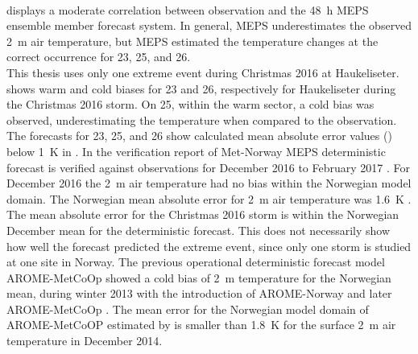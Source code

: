 \\
 displays a moderate correlation between observation and the \SI{48}{\hour} MEPS ensemble member forecast system. In general, MEPS underestimates the observed \SI{2}{\metre} air temperature, but MEPS estimated the temperature changes at the correct occurrence for \num{23}, \num{25}, and \SI{26}{\dec}. 
\\
This thesis uses only one extreme event during Christmas 2016 at Haukeliseter. 
 shows warm and cold biases for \num{23} and \SI{26}{\dec}, respectively for Haukeliseter during the Christmas 2016 storm. On \SI{25}{\dec}, within the warm sector, a cold bias was observed, underestimating the temperature when compared to the observation. The forecasts for \num{23}, \num{25}, and \SI{26}{\dec} show calculated mean absolute error values () below \SIlist{1}{\kelvin} in . 
In the verification report of Met-Norway MEPS deterministic forecast is verified against observations for December 2016 to February 2017 \citep{homleid_verification_2016}. For December 2016 the \SI{2}{\metre} air temperature had no bias within the Norwegian model domain. The Norwegian mean absolute error for \SI{2}{\metre} air temperature was \SI{1.6}{\kelvin} \citep{homleid_verification_2016}. The mean absolute error for the Christmas 2016 storm is within the Norwegian December mean for the deterministic forecast. This does not necessarily show how well the forecast predicted the extreme event, since only one storm is studied at one site in Norway.
The previous operational deterministic forecast model AROME-MetCoOp showed a cold bias of \SI{2}{\metre} temperature for the Norwegian mean, during winter 2013 with the introduction of AROME-Norway and later AROME-MetCoOp \citep{muller_arome-metcoop:_2017}. 
The mean error for the Norwegian model domain of AROME-MetCoOP estimated by \citet{muller_arome-metcoop:_2017} is smaller than \SI{1.8}{\kelvin} for the surface \SI{2}{\metre} air temperature in December 2014. 
\\
